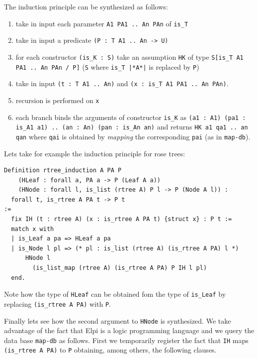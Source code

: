 \documentclass[sigplan,10pt,review]{acmart}\settopmatter{printfolios=true,printccs=false,printacmref=false}
\begin{document}
The induction principle can be synthesized as follows:
\begin{enumerate}
\item take in input each parameter
  \lstinline+A1 PA1 .. An PAn+ of \lstinline+is_T+
\item take in input a predicate \lstinline+(P : T A1 .. An -> U)+
\item for each constructor \lstinline+(is_K : S)+ 
  take an assumption \lstinline+HK+ of type
  \lstinline+S[is_T A1 PA1 .. An PAn / P]+
  (\lstinline+S+ where \lstinline+is_T |*A*|+ is replaced by
  \lstinline+P+)
\item take in input \lstinline+(t : T A1 .. An)+ and
  \lstinline+(x : is_T A1 PA1 .. An PAn)+.
\item recursion is performed on \lstinline+x+
\item each branch binds the arguments of constructor \lstinline+is_K+
  as \lstinline+(a1 : A1) (pa1 : is_A1 a1) .. (an : An) (pan : is_An an)+
  and returns \lstinline+HK a1 qa1 .. an qan+ where
  \lstinline+qai+ is obtained by \emph{mapping} the corresponding
  \lstinline+pai+ (as in \lstinline+map-db+).
\end{enumerate}

Lets take for example the induction principle for rose trees:

\begin{minipage}{\textwidth}\begin{lstlisting}
Definition rtree_induction A PA P  
    (HLeaf : forall a, PA a -> P (Leaf A a))
    (HNode : forall l, is_list (rtree A) P l -> P (Node A l)) :
  forall t, is_rtree A PA t -> P t
:=
  fix IH (t : rtree A) (x : is_rtree A PA t) {struct x} : P t :=
  match x with
  | is_Leaf a pa => HLeaf a pa
  | is_Node l pl => (* pl : is_list (rtree A) (is_rtree A PA) l *)
      HNode l
        (is_list_map (rtree A) (is_rtree A PA) P IH l pl)
  end.
\end{lstlisting}\end{minipage}

Note how the type of \lstinline+HLeaf+ can be obtained fom the
type of \lstinline+is_Leaf+ by replacing \lstinline+(is_rtree A PA)+
with \lstinline+P+.

Finally lets see  how the second argument to \lstinline+HNode+ is
synthesized.  We take advantage of the fact that Elpi is a logic
programming language and we query the data base \lstinline+map-db+
as follows. First we temporarily register 
the fact that \lstinline+IH+ maps
\lstinline+(is_rtree A PA)+ to \lstinline+P+ obtaining, among others,
the following clauses.
\end{document}
